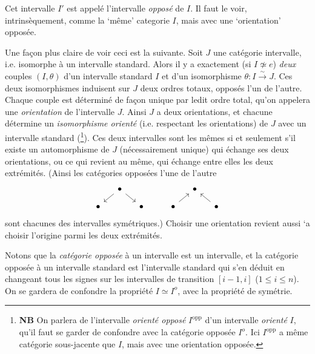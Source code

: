 \documentclass[11pt]{article}
\newcommand{\printedpage}[1]{\if\relax\detokenize{#1}\relax\else\marginpar{\raggedright\footnotesize p.~#1}\fi}
\newcommand{\msp}[1]{\marginpar{\raggedright\footnotesize [#1]}}
\begin{document}
Cet intervalle $I'$ est appelé l'intervalle \textit{opposé} de $I$. Il faut le voir, intrinsèquement, comme la `même' categorie $I$, %
mais avec une `orientation' opposée.

\msp{page 8}

Une façon plus claire de voir ceci est la suivante. Soit $J$ une catégorie intervalle, i.e. isomorphe à un intervalle standard. Alors il y a exactement (si $I \not\simeq e$) \textit{deux} couples $(I,\theta)$ d'un intervalle standard $I$ et d'un isomorphisme $\theta : I \xrightarrow{\sim} J$. Ces deux isomorphismes induisent sur $J$ deux ordres totaux, opposés l'un de l'autre. Chaque couple est déterminé de façon unique par ledit ordre total, qu'on appelera %
une \textit{orientation} de l'intervalle $J$. Ainsi $J$ a deux orientations, et chacune détermine un \textit{isomorphisme orienté} (i.e. respectant
\printedpage{5}
les orientations) de $J$ avec un intervalle standard (\footnote[2]{\textbf{NB} On parlera de l'intervalle \textit{orienté opposé} $I^{\mathrm{opp}}$ d'un intervalle \textit{orienté} $I$, qu'il faut se garder de confondre avec la catégorie opposée $I^o$. Ici $I^{\mathrm{opp}}$ a même catégorie sous-jacente que $I$, mais avec une orientation opposée.}). Ces deux intervalles sont les mêmes si et seulement s'il existe un automorphisme de $J$ (nécessairement unique) qui échange ses deux orientations, ou ce qui revient au même, qui échange entre elles les deux extrémités. (Ainsi les catégories opposées l'une de l'autre
\[
\begin{tikzcd}[column sep=small, row sep=small]
 & \bullet \arrow[dl] \arrow[dr] & & & & \bullet & \\
 \bullet & & \bullet & & \bullet \arrow[ur] & & \bullet \arrow[ul]
\end{tikzcd}
\]
sont chacunes %
des intervalles symétriques.) Choisir une orientation revient aussi `a %
choisir l'origine parmi les deux extrémités.

Notons que la \textit{catégorie opposée} à un intervalle est un intervalle, et la catégorie opposée à un intervalle standard est l'intervalle standard qui s'en déduit en changeant tous les signes sur les intervalles de transition $[i-1,i]$ ($1 \leq i \leq n$). On se gardera de confondre la propriété $I \simeq I^o$, avec la propriété de symétrie.

\msp{page 9}
\end{document}
